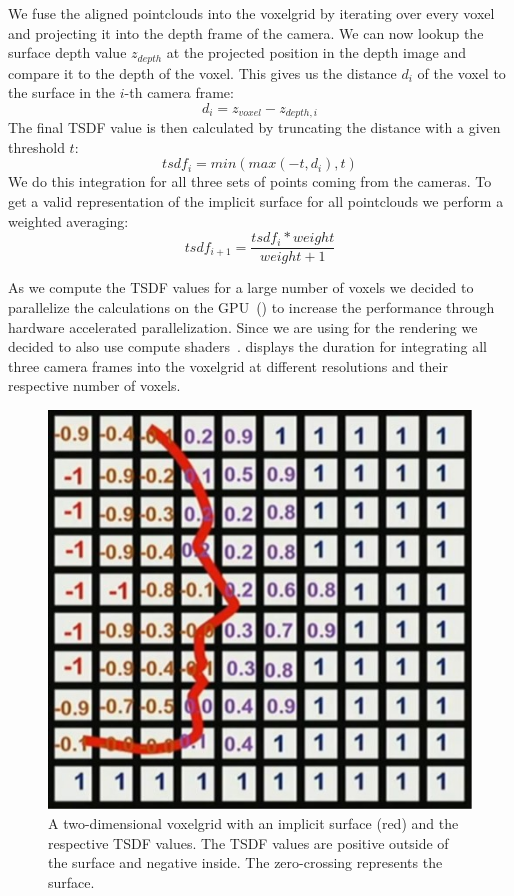 \documentclass[10pt,twocolumn,letterpaper]{article}
\begin{document}
We fuse the aligned pointclouds into the voxelgrid by iterating over every voxel and projecting it into the depth frame of the camera. We can now lookup the surface depth value $z_{depth}$ at the projected position in the depth image and compare it to the depth of the voxel. This gives us the distance $d_i$ of the voxel to the surface in the $i$-th camera frame:
\begin{equation}\label{eq1}
d_i = z_{voxel} - z_{depth,i}
\end{equation}
The final TSDF value is then calculated by truncating the distance with a given threshold $t$:
\begin{equation}
	tsdf_i = min(max(-t, d_i), t)
\end{equation}
We do this integration for all three sets of points coming from the cameras. To get a valid representation of the implicit surface for all pointclouds we perform a weighted averaging: 
\begin{equation}\label{eq2}
tsdf_{i+1}=\frac{tsdf_{i} * weight}{weight+1}
\end{equation}

As we compute the TSDF values for a large number of voxels we decided to parallelize the calculations on the GPU~() to increase the performance through hardware accelerated parallelization. Since we are using \opengl{} for the rendering we decided to also use \opengl{} compute shaders~\cite{Authors1}.  displays the duration for integrating all three camera frames into the voxelgrid at different resolutions and their respective number of voxels. \\

\begin{figure}[t]
\begin{center}
\includegraphics[width=0.6\linewidth]{imgs/tsdf}
\end{center}
 \caption{A two-dimensional voxelgrid with an implicit surface (red) and the respective TSDF values. The TSDF values are positive outside of the surface and negative inside. The zero-crossing represents the surface.}
 \label{fig:voxelgrid}
\end{figure}
\end{document}
